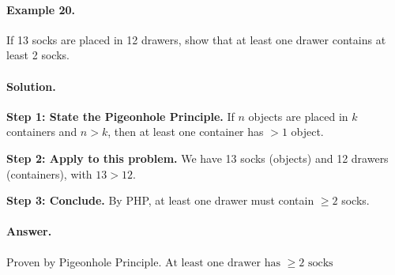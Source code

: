 \documentclass[12pt]{extarticle}
\begin{document}
\paragraph{Example 20.} If 13 socks are placed in 12 drawers, show that at least one drawer contains at least 2 socks.

\paragraph{Solution.}
\textbf{Step 1: State the Pigeonhole Principle.} If $n$ objects are placed in $k$ containers and $n > k$, then at least one container has $> 1$ object.

\textbf{Step 2: Apply to this problem.} We have 13 socks (objects) and 12 drawers (containers), with $13 > 12$.

\textbf{Step 3: Conclude.} By PHP, at least one drawer must contain $\ge 2$ socks.

\paragraph{Answer.} Proven by Pigeonhole Principle. $\boxed{\text{At least one drawer has } \ge 2 \text{ socks}}$
\end{document}
